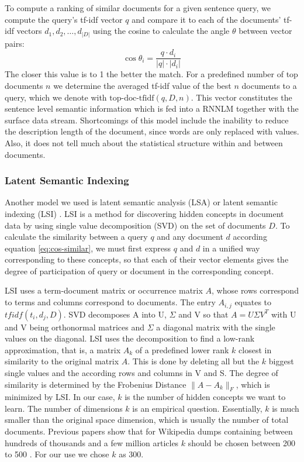\documentclass[a4paper]{article}
\begin{document}
To compute a ranking of similar documents for a given sentence query, we compute the query's tf-idf vector $q$ and compare it to each of the documents' tf-idf vectors $d_1, d_2, \ldots, d_{|D|}$ using the cosine to calculate the angle $\theta$ between vector pairs:
\begin{equation} \label{eq:cos-similar}
\cos \theta_i = \dfrac{q \cdot d_i}{|q| \cdot |d_i|}
\end{equation} 
The closer this value is to 1 the better the match.
For a predefined number of top documents $n$ we determine the averaged tf-idf value of the best $n$ documents to a query, which we denote with $\text{top-doc-tfidf}(q, D, n)$.
This vector constitutes the sentence level semantic information which is fed into a RNNLM together with the surface data stream.
Shortcomings of this model include the inability to reduce the description length of the document, since words are only replaced with values. Also, it does not tell much about the statistical structure within and between documents.


\subsubsection{Latent Semantic Indexing}
Another model we used is latent semantic analysis (LSA) or latent semantic indexing (LSI) \cite{deerwester1990indexing}.
LSI is a method for discovering hidden concepts in document data by using single value decomposition (SVD) on the set of documents $D$.
To calculate the similarity between a query $q$ and any document $d$ according equation \ref{eq:cos-similar}, we must first express $q$ and $d$ in a unified way corresponding to these concepts, so that each of their vector elements gives the degree of participation of query or document in the corresponding concept. 

LSI uses a term-document matrix or occurrence matrix $A$, whose rows correspond to terms and columns correspond to documents. The entry $A_{i,j}$ equates to $tfidf(t_i, d_j, D)$. SVD decomposes A into U, $\Sigma$ and V so that $A = U \Sigma V^T $ with U and V being orthonormal matrices and $\Sigma$ a diagonal matrix with the single values on the diagonal.
LSI uses the decomposition to find a low-rank approximation, that is, a matrix $A_k$ of a predefined lower rank $k$ closest in similarity to the original matrix $A$. This is done by deleting all but the $k$ biggest single values and the according rows and columns in V and S.
The degree of similarity is determined by the Frobenius Distance $\|A-A_k\|_F$, which is minimized by LSI. In our case, $k$ is the number of hidden concepts we want to learn. The number of dimensions $k$ is an empirical question. Essentially, $k$ is much smaller than the original space dimension, which is usually the number of total documents. Previous papers show that for Wikipedia dumps containing between hundreds of thousands and a few million articles $k$ should be chosen between 200 to 500 \cite{bradford2008empirical}. For our use we chose $k$ as 300.
\end{document}
